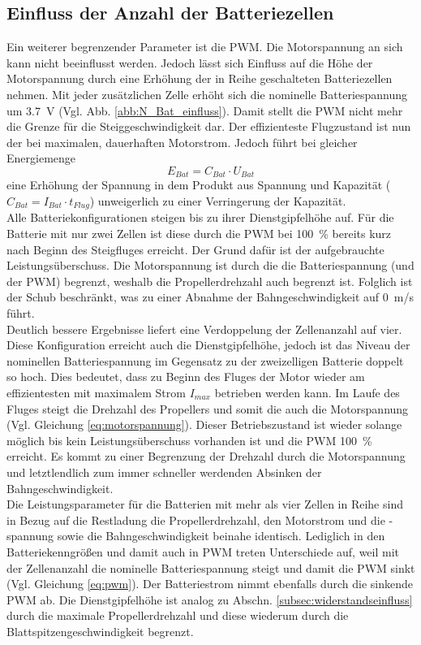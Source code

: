 \subsection{Einfluss der Anzahl der Batteriezellen}
\label{subsec:einfluss_n_bat}
Ein weiterer begrenzender Parameter ist die PWM. Die Motorspannung an sich kann nicht beeinflusst werden. Jedoch lässt sich Einfluss auf die Höhe der Motorspannung durch eine Erhöhung der in Reihe geschalteten Batteriezellen nehmen. Mit jeder zusätzlichen Zelle erhöht sich die nominelle Batteriespannung um \SI{3,7}{V} (Vgl. Abb. \ref{abb:N_Bat_einfluss}). Damit stellt die PWM nicht mehr die Grenze für die Steiggeschwindigkeit dar. Der effizienteste Flugzustand ist nun der bei maximalen, dauerhaften Motorstrom. Jedoch führt bei gleicher Energiemenge 
\begin{equation}
	E_{Bat} = C_{Bat}\cdot U_{Bat}
\end{equation}
eine Erhöhung der Spannung in dem Produkt aus Spannung und Kapazität (\ensuremath{C_{Bat} = I_{Bat}\cdot t_{Flug}}) unweigerlich zu einer Verringerung der Kapazität.  \\
Alle Batteriekonfigurationen steigen bis zu ihrer Dienstgipfelhöhe auf. 
Für die Batterie mit nur zwei Zellen ist diese durch die PWM bei \SI{100}{\%} bereits kurz nach Beginn des Steigfluges erreicht. Der Grund dafür ist der aufgebrauchte Leistungsüberschuss. Die Motorspannung ist durch die die Batteriespannung (und der PWM) begrenzt, weshalb die Propellerdrehzahl auch begrenzt ist. Folglich ist der Schub beschränkt, was zu einer Abnahme der Bahngeschwindigkeit auf \SI{0}{m/s} führt. \\
Deutlich bessere Ergebnisse liefert eine Verdoppelung der Zellenanzahl auf vier. Diese Konfiguration erreicht auch die Dienstgipfelhöhe, jedoch ist das Niveau der nominellen Batteriespannung im Gegensatz zu der zweizelligen Batterie doppelt so hoch. Dies bedeutet, dass zu Beginn des Fluges der Motor wieder am effizientesten mit maximalem Strom \ensuremath{I_{max}} betrieben werden kann. Im Laufe des Fluges steigt die Drehzahl des Propellers und somit die auch die Motorspannung (Vgl. Gleichung \ref{eq:motorspannung}). Dieser Betriebszustand ist wieder solange möglich bis kein Leistungsüberschuss vorhanden ist und die PWM \SI{100}{\%} erreicht. Es kommt zu einer Begrenzung der Drehzahl durch die Motorspannung und letztlendlich zum immer schneller werdenden Absinken der Bahngeschwindigkeit. \\
Die Leistungsparameter für die Batterien mit mehr als vier Zellen in Reihe sind in Bezug auf die Restladung die Propellerdrehzahl, den Motorstrom und die -spannung sowie die Bahngeschwindigkeit beinahe identisch. Lediglich in den Batteriekenngrößen und damit auch in PWM treten Unterschiede auf, weil mit der Zellenanzahl die nominelle Batteriespannung steigt und damit die PWM sinkt (Vgl. Gleichung \ref{eq:pwm}). Der Batteriestrom nimmt ebenfalls durch die sinkende PWM ab. Die Dienstgipfelhöhe ist analog zu Abschn. \ref{subsec:widerstandseinfluss} durch die maximale Propellerdrehzahl und diese wiederum durch die Blattspitzengeschwindigkeit begrenzt. \\
